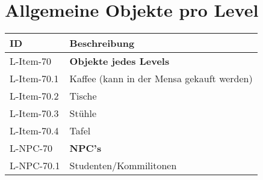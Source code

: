 \section{Allgemeine Objekte pro Level}
\begin{tabularx}{\textwidth}{|l|l|}
\toprule
\textbf{ID} & \textbf{Beschreibung}\\
\endhead
\hline
L-Item-70 & \textbf{Objekte jedes Levels} \\
L-Item-70.1 & Kaffee (kann in der Mensa gekauft werden) \\
L-Item-70.2 & Tische \\
L-Item-70.3 & Stühle \\
L-Item-70.4 & Tafel \\
\hline
L-NPC-70 & \textbf{NPC's} \\
L-NPC-70.1 & Studenten/Kommilitonen \\
\hline
\end{tabularx}

